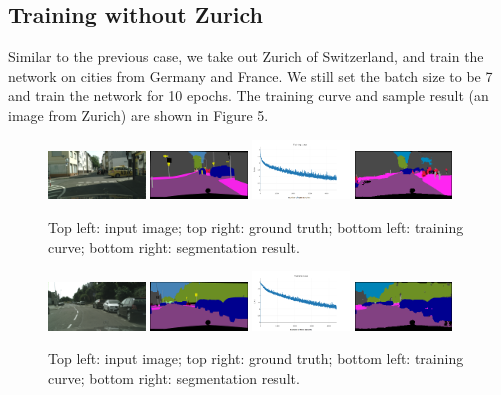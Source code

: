 \documentclass[10pt,twocolumn,letterpaper]{article}
\begin{document}
\subsection{Training without Zurich}
Similar to the previous case, we take out Zurich of Switzerland, and train the network on cities from Germany and France. We still set the batch size to be 7 and train the network for 10 epochs. The training curve and sample result (an image from Zurich) are shown in Figure 5.

\begin{figure}[h]
	\centering
	\includegraphics[width=0.23\textwidth]{frankfurt.png}
	\includegraphics[width=0.23\textwidth]{frankfurt_gt.png}
	\includegraphics[width=0.23\textwidth]{curve_all.png}
	\includegraphics[width=0.23\textwidth]{frankfurt_seg.png}
	\caption{Top left: input image; top right: ground truth; bottom left: training curve; bottom right: segmentation result.}
	\label{fig:figure2}
\end{figure}

\begin{figure}[h]
	\centering
	\includegraphics[width=0.23\textwidth]{strasbourg.png}
	\includegraphics[width=0.23\textwidth]{strasbourg_gt.png}
	\includegraphics[width=0.23\textwidth]{curve_without_strasbourg.png}
	\includegraphics[width=0.23\textwidth]{strasbourg_seg.png}
	\caption{Top left: input image; top right: ground truth; bottom left: training curve; bottom right: segmentation result.}
	\label{fig:figure3}
\end{figure}
\end{document}
